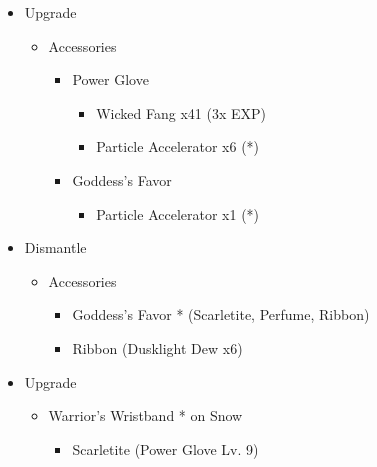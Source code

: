 \begin{multicols}{2}
\begin{upgrade}
\begin{itemize}
    \item Upgrade
    \begin{itemize}
        \item Accessories
        \begin{itemize}
            \item Power Glove
            \begin{itemize}
                \item Wicked Fang x41 (3x EXP)
                \item Particle Accelerator x6 (*)
            \end{itemize}
            \item Goddess's Favor
            \begin{itemize}
                \item Particle Accelerator x1 (*)
            \end{itemize}
        \end{itemize}
    \end{itemize}
    \item Dismantle
    \begin{itemize}
        \item Accessories
        \begin{itemize}
            \item Goddess's Favor * (Scarletite, Perfume, Ribbon)
            \item Ribbon (Dusklight Dew x6)
        \end{itemize}
    \end{itemize}
    \item Upgrade
    \begin{itemize}
        \item Warrior's Wristband * on Snow
        \begin{itemize}
            \item Scarletite (Power Glove Lv. 9)
        \end{itemize}
    \end{itemize}
\end{itemize}
\end{upgrade}
\end{multicols}

